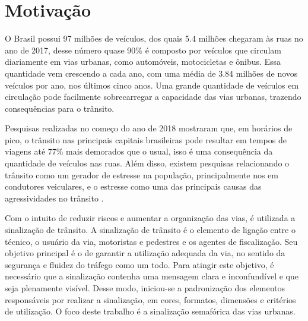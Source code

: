\section{Motivação}

O Brasil possui 97 milhões de veículos, dos quais 5.4 milhões chegaram às ruas no ano de 2017, desse número quase 90\% é composto por veículos que circulam diariamente em vias urbanas, como automóveis, motocicletas e ônibus. Essa quantidade vem crescendo a cada ano, com uma média de 3.84 milhões de novos veículos por ano, nos últimos cinco anos. %
Uma grande quantidade de veículos em circulação pode facilmente sobrecarregar a capacidade das vias urbanas, trazendo consequências para o trânsito.

Pesquisas realizadas no começo do ano de 2018 mostraram que, em horários de pico, o trânsito nas principais capitais brasileiras pode resultar em tempos de viagens até 77\% mais demorados que o usual\cite{recife}, %
isso é uma consequência da quantidade de veículos nas ruas. Além disso, existem pesquisas relacionando o trânsito como um gerador de estresse na população, principalmente nos em condutores veiculares, e o estresse como uma das principais causas das agressividades no trânsito \cite{stress}\cite{stress2}.  %

Com o intuito de reduzir riscos e aumentar a organização das vias, é utilizada a sinalização de trânsito. A sinalização de trânsito é o elemento de ligação entre o técnico, o usuário da via, motoristas e pedestres e os agentes de fiscalização. Seu objetivo principal é o de garantir a utilização adequada da via, no sentido da segurança e fluidez do tráfego como um todo. Para atingir este objetivo, é necessário que a sinalização contenha uma mensagem clara e inconfundível e que seja plenamente visível. Desse modo, iniciou-se a padronização dos elementos responsáveis por realizar a sinalização, em cores, formatos, dimensões e critérios de utilização\cite{CET}. %
O foco deste trabalho é a sinalização semafórica das vias urbanas.

